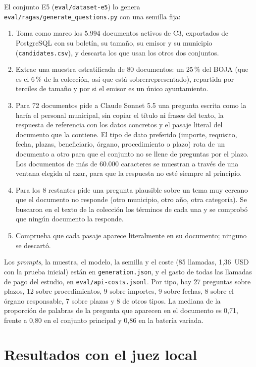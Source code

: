 El conjunto E5 (\texttt{eval/dataset-e5}) lo genera \texttt{eval/ragas/generate\_questions.py} con una semilla fija:

\begin{enumerate}
  \item Toma como marco los 5.994 documentos activos de C3, exportados de PostgreSQL con su boletín, su tamaño, su emisor y su municipio (\texttt{candidates.csv}), y descarta los que usan los otros dos conjuntos.
  \item Extrae una muestra estratificada de 80 documentos: un 25\,\% del BOJA (que es el 6\,\% de la colección, así que está sobrerrepresentado), repartida por terciles de tamaño y por si el emisor es un único ayuntamiento.
  \item Para 72 documentos pide a Claude Sonnet 5.5 una pregunta escrita como la haría el personal municipal, sin copiar el título ni frases del texto, la respuesta de referencia con los datos concretos y el pasaje literal del documento que la contiene. El tipo de dato preferido (importe, requisito, fecha, plazas, beneficiario, órgano, procedimiento o plazo) rota de un documento a otro para que el conjunto no se llene de preguntas por el plazo. Los documentos de más de 60.000 caracteres se muestran a través de una ventana elegida al azar, para que la respuesta no esté siempre al principio.
  \item Para los 8 restantes pide una pregunta plausible sobre un tema muy cercano que el documento no responde (otro municipio, otro año, otra categoría). Se buscaron en el texto de la colección los términos de cada una y se comprobó que ningún documento la responde.
  \item Comprueba que cada pasaje aparece literalmente en su documento; ninguno se descartó.
\end{enumerate}

Los \emph{prompts}, la muestra, el modelo, la semilla y el coste (85 llamadas, 1,36~USD con la prueba inicial) están en \texttt{generation.json}, y el gasto de todas las llamadas de pago del estudio, en \texttt{eval/api-costs.jsonl}. Por tipo, hay 27 preguntas sobre plazos, 12 sobre procedimientos, 9 sobre importes, 9 sobre fechas, 8 sobre el órgano responsable, 7 sobre plazas y 8 de otros tipos. La mediana de la proporción de palabras de la pregunta que aparecen en el documento es 0,71, frente a 0,80 en el conjunto principal y 0,86 en la batería variada.

\section{Resultados con el juez local}
\label{sec:ap-qwen}

